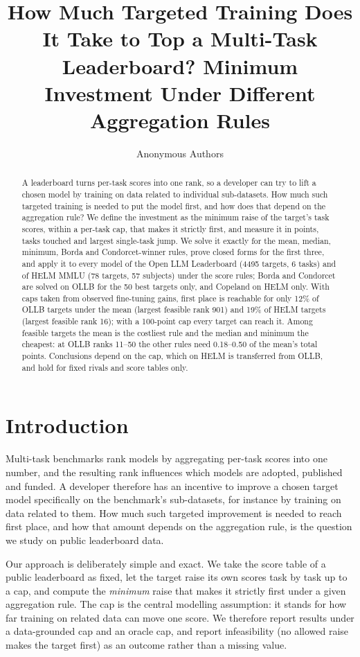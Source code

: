 \documentclass{article}
\title{How Much Targeted Training Does It Take to Top a Multi-Task Leaderboard? Minimum Investment Under Different Aggregation Rules}
\author{Anonymous Authors}
\begin{document}
\maketitle

\begin{abstract}
A leaderboard turns per-task scores into one rank, so a developer can try to lift a chosen model by training on data related to individual sub-datasets. How much such targeted training is needed to put the model first, and how does that depend on the aggregation rule? We define the investment as the minimum raise of the target's task scores, within a per-task cap, that makes it strictly first, and measure it in points, tasks touched and largest single-task jump. We solve it exactly for the mean, median, minimum, Borda and Condorcet-winner rules, prove closed forms for the first three, and apply it to every model of the Open LLM Leaderboard (4495 targets, 6 tasks) and of HELM MMLU (78 targets, 57 subjects) under the score rules; Borda and Condorcet are solved on OLLB for the 50 best targets only, and Copeland on HELM only. With caps taken from observed fine-tuning gains, first place is reachable for only 12\% of OLLB targets under the mean (largest feasible rank 901) and 19\% of HELM targets (largest feasible rank 16); with a 100-point cap every target can reach it. Among feasible targets the mean is the costliest rule and the median and minimum the cheapest: at OLLB ranks 11--50 the other rules need 0.18--0.50 of the mean's total points. Conclusions depend on the cap, which on HELM is transferred from OLLB, and hold for fixed rivals and score tables only.
\end{abstract}

\section{Introduction}
\label{sec:intro}
Multi-task benchmarks rank models by aggregating per-task scores into one number, and the resulting rank influences which models are adopted, published and funded. A developer therefore has an incentive to improve a chosen target model specifically on the benchmark's sub-datasets, for instance by training on data related to them. How much such targeted improvement is needed to reach first place, and how that amount depends on the aggregation rule, is the question we study on public leaderboard data.

Our approach is deliberately simple and exact. We take the score table of a public leaderboard as fixed, let the target raise its own scores task by task up to a cap, and compute the \emph{minimum} raise that makes it strictly first under a given aggregation rule. The cap is the central modelling assumption: it stands for how far training on related data can move one score. We therefore report results under a data-grounded cap and an oracle cap, and report infeasibility (no allowed raise makes the target first) as an outcome rather than a missing value.
\end{document}
